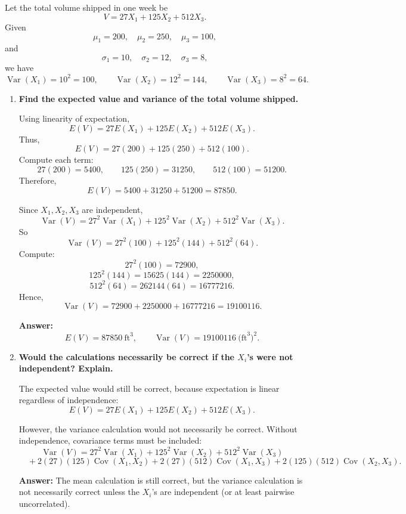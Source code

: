 \documentclass[11pt]{article}
\begin{document}
Let the total volume shipped in one week be
\[
V=27X_1+125X_2+512X_3.
\]
Given
\[
\mu_1=200,\quad \mu_2=250,\quad \mu_3=100,
\]
and
\[
\sigma_1=10,\quad \sigma_2=12,\quad \sigma_3=8,
\]
we have
\[
\operatorname{Var}(X_1)=10^2=100,\qquad
\operatorname{Var}(X_2)=12^2=144,\qquad
\operatorname{Var}(X_3)=8^2=64.
\]

\begin{enumerate}
    \item[(a)] \textbf{Find the expected value and variance of the total volume shipped.}

    Using linearity of expectation,
    \[
    E(V)=27E(X_1)+125E(X_2)+512E(X_3).
    \]
    Thus,
    \[
    E(V)=27(200)+125(250)+512(100).
    \]
    Compute each term:
    \[
    27(200)=5400,\qquad 125(250)=31250,\qquad 512(100)=51200.
    \]
    Therefore,
    \[
    E(V)=5400+31250+51200=87850.
    \]

    Since $X_1,X_2,X_3$ are independent,
    \[
    \operatorname{Var}(V)=27^2\operatorname{Var}(X_1)+125^2\operatorname{Var}(X_2)+512^2\operatorname{Var}(X_3).
    \]
    So
    \[
    \operatorname{Var}(V)=27^2(100)+125^2(144)+512^2(64).
    \]
    Compute:
    \[
    27^2(100)=72900,
    \]
    \[
    125^2(144)=15625(144)=2250000,
    \]
    \[
    512^2(64)=262144(64)=16777216.
    \]
    Hence,
    \[
    \operatorname{Var}(V)=72900+2250000+16777216=19100116.
    \]

    \textbf{Answer:}
    \[
    E(V)=87850\ \text{ft}^3,
    \qquad
    \operatorname{Var}(V)=19100116\ \text{(ft}^3)^2.
    \]

    \item[(b)] \textbf{Would the calculations necessarily be correct if the $X_i$'s were not independent? Explain.}

    The expected value would still be correct, because expectation is linear regardless of independence:
    \[
    E(V)=27E(X_1)+125E(X_2)+512E(X_3).
    \]

    However, the variance calculation would not necessarily be correct. Without independence, covariance terms must be included:
    \[
    \operatorname{Var}(V)=27^2\operatorname{Var}(X_1)+125^2\operatorname{Var}(X_2)+512^2\operatorname{Var}(X_3)
    \]
    \[
    \quad +2(27)(125)\operatorname{Cov}(X_1,X_2)
    +2(27)(512)\operatorname{Cov}(X_1,X_3)
    +2(125)(512)\operatorname{Cov}(X_2,X_3).
    \]

    \textbf{Answer:} The mean calculation is still correct, but the variance calculation is not necessarily correct unless the $X_i$'s are independent (or at least pairwise uncorrelated).
\end{enumerate}
\end{document}
